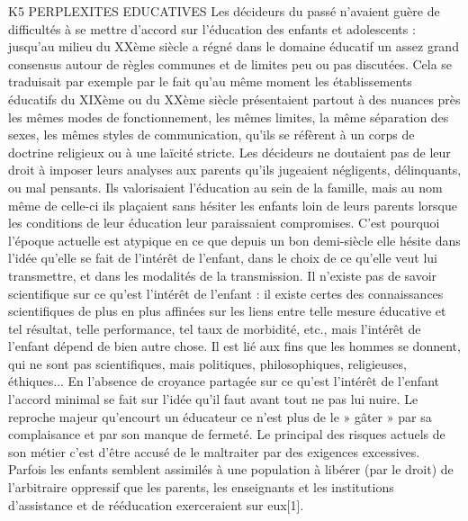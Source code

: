 K5 PERPLEXITES EDUCATIVES
 Les décideurs du passé n'avaient guère de difficultés à se mettre d'accord sur l'éducation des enfants et adolescents : jusqu'au milieu du XXème siècle a régné dans le domaine éducatif un assez grand consensus autour de règles communes et de limites peu ou pas discutées. Cela se traduisait par exemple par le fait qu'au même moment les établissements éducatifs du XIXème ou du XXème siècle présentaient partout à des nuances près les mêmes modes de fonctionnement, les mêmes limites, la même séparation des sexes, les mêmes styles de communication, qu'ils se réfèrent à un corps de doctrine religieux ou à une laïcité stricte. Les décideurs ne doutaient pas de leur droit à imposer leurs analyses aux parents qu'ils jugeaient négligents, délinquants, ou mal pensants. Ils valorisaient l'éducation au sein de la famille, mais au nom même de celle-ci ils plaçaient sans hésiter les enfants loin de leurs parents lorsque les conditions de leur éducation leur paraissaient compromises. C'est pourquoi l'époque actuelle est atypique en ce que depuis un bon demi-siècle elle hésite dans l'idée qu'elle se fait de l'intérêt de l'enfant, dans le choix de ce qu'elle veut lui transmettre, et dans les modalités de la transmission. 
 Il n'existe pas de savoir scientifique sur ce qu'est l'intérêt de l'enfant : il existe certes des connaissances scientifiques de plus en plus affinées sur les liens entre telle mesure éducative et tel résultat, telle performance, tel taux de morbidité, etc., mais l'intérêt de l'enfant dépend de bien autre chose. Il est lié aux fins que les hommes se donnent, qui ne sont pas scientifiques, mais politiques, philosophiques, religieuses, éthiques... 
 En l'absence de croyance partagée sur ce qu'est l'intérêt de l'enfant l'accord minimal se fait sur l'idée qu'il faut avant tout ne pas lui nuire. Le reproche majeur qu'encourt un éducateur ce n'est plus de le » gâter » par sa complaisance et par son manque de fermeté. Le principal des risques actuels de son métier c'est d'être accusé de le maltraiter par des exigences excessives. Parfois les enfants semblent assimilés à une population à libérer (par le droit) de l'arbitraire oppressif que les parents, les enseignants et les institutions d'assistance et de rééducation exerceraient sur eux[1].
